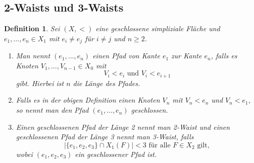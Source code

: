 \documentclass[12pt,titlepage]{article}
\newtheorem{definition}{Definition}[section]
\begin{document}
\subsection{2-Waists und 3-Waists }
\begin{definition}
Sei $(X,<)$ eine geschlossene simpliziale Fläche und $e_1,\ldots,e_n\in X_1$ mit $ e_i \neq e_j$ für $i \neq j$ und $n \geq 2$.
\begin{enumerate}
\item   Man nennt $(e_1,\ldots,e_n)$ einen \emph{Pfad von Kante $e_1$ zur Kante $e_n$}, falls es Knoten $V_1,\ldots,V_{n-1}\in X_0$ mit 
\[
V_i<e_i \text{ und } V_i<e_{i+1}
\] 
gibt.
Hierbei ist $n$ die Länge des Pfades.
\item Falls es in der obigen Definition einen Knoten $V_n$ mit $V_n<e_n$ und $V_n<e_1$, so nennt man den Pfad $(e_1,\ldots,e_n)$ geschlossen.
\item Einen geschlossenen Pfad der Länge 2 nennt man \emph{2-Waist} und einen geschlossenen Pfad der Länge 3 nennt man \emph{3-Waist}, falls 
\[
\vert \{e_1,e_2,e_3\}\cap X_1(F) \vert< 3\text{ für alle } F \in X_2 \text{ gilt},
\]
wobei $(e_1,e_2,e_3)$ ein geschlossener Pfad ist.
\end{enumerate}
\end{definition}
\end{document}
